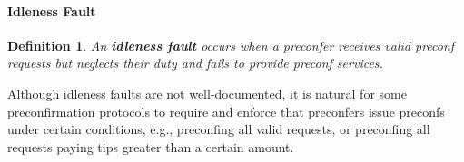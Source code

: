\documentclass[a4paper]{article}
\theoremstyle{boldstyle}
\newtheorem{definitionx}{Definition}
\newenvironment{definition}
  {\begin{defopenboxq}\begin{definitionx}}
  {\end{definitionx}\end{defopenboxq}}
\newcommand{\cm}[1]{\textcolor{blue}{\textbf{Conor:} #1}}
\newcommand{\dk}[1]{\textcolor{cyan}{\textbf{Demetris:} #1}}
\newcommand{\ks}[1]{\textcolor{purple}{\textbf{Katerina:} #1}}
\begin{document}
            
        
    
            
        
    \paragraph{Idleness Fault}
        \begin{definition}
            An \textbf{idleness fault} occurs when a preconfer receives valid preconf requests but neglects their duty and fails to provide preconf services.
        \end{definition}
       Although idleness faults are not well-documented, it is natural for some preconfirmation protocols to require and enforce that preconfers issue preconfs under certain conditions, e.g., preconfing all valid requests, or preconfing all requests paying tips greater than a certain amount.
            
\end{document}
